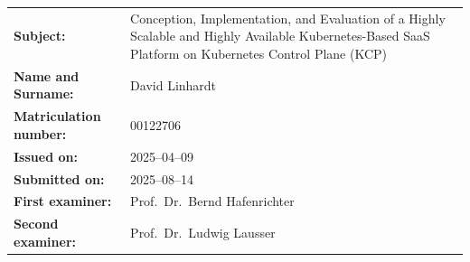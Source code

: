\documentclass[11pt, a4paper, oneside, listof=totoc]{scrartcl}
\newcommand{\thesistitle}{Conception, Implementation, and Evaluation of a Highly Scalable and Highly Available Kubernetes-Based SaaS Platform on Kubernetes Control Plane (KCP)}
\begin{document}
\begin{titlepage}
        \begin{tabularx}{\textwidth}{@{}lX@{}}
            \textbf{Subject:} & \thesistitle\\[2cm]
            \textbf{Name and Surname:} & David Linhardt \\[0.5cm]
            \textbf{Matriculation number:} & 00122706\\[2cm]     
            \textbf{Issued on:} & 2025--04--09 \\[0.5cm]           
            \textbf{Submitted on:} & 2025--08--14 \\[2cm]           
            \textbf{First examiner:} & Prof.\ Dr.\ Bernd Hafenrichter \\[0.5cm]      
            \textbf{Second examiner:} & Prof.\ Dr.\ Ludwig Lausser \\
        \end{tabularx}

    \end{titlepage}
\end{document}

